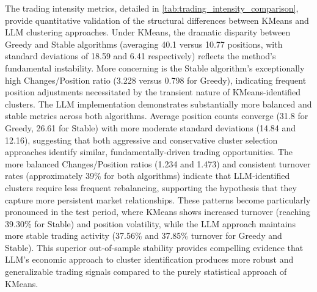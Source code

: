 

The trading intensity metrics, detailed in \cref{tab:trading_intensity_comparison}, provide quantitative validation of the structural differences between KMeans and LLM clustering approaches. Under KMeans, the dramatic disparity between Greedy and Stable algorithms (averaging 40.1 versus 10.77 positions, with standard deviations of 18.59 and 6.41 respectively) reflects the method's fundamental instability. More concerning is the Stable algorithm's exceptionally high Changes/Position ratio (3.228 versus 0.798 for Greedy), indicating frequent position adjustments necessitated by the transient nature of KMeans-identified clusters.
The LLM implementation demonstrates substantially more balanced and stable metrics across both algorithms. Average position counts converge (31.8 for Greedy, 26.61 for Stable) with more moderate standard deviations (14.84 and 12.16), suggesting that both aggressive and conservative cluster selection approaches identify similar, fundamentally-driven trading opportunities. The more balanced Changes/Position ratios (1.234 and 1.473) and consistent turnover rates (approximately 39\% for both algorithms) indicate that LLM-identified clusters require less frequent rebalancing, supporting the hypothesis that they capture more persistent market relationships.
These patterns become particularly pronounced in the test period, where KMeans shows increased turnover (reaching 39.30\% for Stable) and position volatility, while the LLM approach maintains more stable trading activity (37.56\% and 37.85\% turnover for Greedy and Stable). This superior out-of-sample stability provides compelling evidence that LLM's economic approach to cluster identification produces more robust and generalizable trading signals compared to the purely statistical approach of KMeans.

